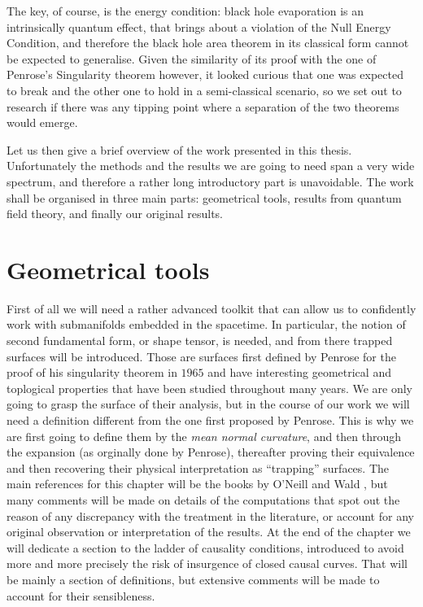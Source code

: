 The key, of course, is the energy condition: black hole evaporation is an intrinsically quantum effect, that brings about a violation of the Null Energy Condition, and therefore the black hole area theorem in its classical form cannot be expected to generalise. Given the similarity of its proof with the one of Penrose's Singularity theorem however, it looked curious that one was expected to break and the other one to hold in a semi-classical scenario, so we set out to research if there was any tipping point where a separation of the two theorems would emerge.

Let us then give a brief overview of the work presented in this thesis. Unfortunately the methods and the results we are going to need span a very wide spectrum, and therefore a rather long introductory part is unavoidable. The work shall be organised in three main parts: geometrical tools, results from quantum field theory, and finally our original results.

\section{Geometrical tools}
First of all we will need a rather advanced toolkit that can allow us to confidently work with submanifolds embedded in the spacetime. In particular, the notion of second fundamental form, or shape tensor, is needed, and from there trapped surfaces will be introduced. Those are surfaces first defined by Penrose for the proof of his singularity theorem in \(1965\) and have interesting geometrical and toplogical properties that have been studied throughout many years. We are only going to grasp the surface of their analysis, but in the course of our work we will need a definition different from the one first proposed by Penrose. This is why we are first going to define them by the \emph{mean normal curvature}, and then through the expansion (as orginally done by Penrose), thereafter proving their equivalence and then recovering their physical interpretation as ``trapping'' surfaces.
The main references for this chapter will be the books by O'Neill \cite[]{o1983semi} and Wald \cite[]{wald2010general}, but many comments will be made on details of the computations that spot out the reason of any discrepancy with the treatment in the literature, or account for any original observation or interpretation of the results.
At the end of the chapter we will dedicate a section to the ladder of causality conditions, introduced to avoid more and more precisely the risk of insurgence of closed causal curves. That will be mainly a section of definitions, but extensive comments will be made to account for their sensibleness.  

